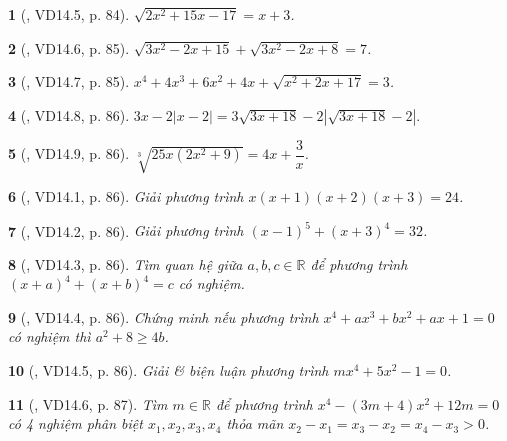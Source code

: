 \documentclass{article}
\newtheorem{baitoan}{}
\begin{document}
\begin{baitoan}[\cite{TLCT_THCS_Toan_9_dai_so}, VD14.5, p. 84]
	$\sqrt{2x^2 + 15x - 17} = x + 3$.
\end{baitoan}

\begin{baitoan}[\cite{TLCT_THCS_Toan_9_dai_so}, VD14.6, p. 85]
	$\sqrt{3x^2 - 2x + 15} + \sqrt{3x^2 - 2x + 8} = 7$.
\end{baitoan}

\begin{baitoan}[\cite{TLCT_THCS_Toan_9_dai_so}, VD14.7, p. 85]
	$x^4 + 4x^3 + 6x^2 + 4x + \sqrt{x^2 + 2x + 17} = 3$.
\end{baitoan}

\begin{baitoan}[\cite{TLCT_THCS_Toan_9_dai_so}, VD14.8, p. 86]
	$3x - 2|x - 2| = 3\sqrt{3x + 18} - 2|\sqrt{3x + 18} - 2|.$
 \end{baitoan}

\begin{baitoan}[\cite{TLCT_THCS_Toan_9_dai_so}, VD14.9, p. 86]
	$\sqrt[3]{25x(2x^2 + 9)} = 4x + \dfrac{3}{x}$.
\end{baitoan}

\begin{baitoan}[\cite{TLCT_THCS_Toan_9_dai_so}, VD14.1, p. 86]
	Giải phương trình $x(x + 1)(x + 2)(x + 3) = 24$.
\end{baitoan}

\begin{baitoan}[\cite{TLCT_THCS_Toan_9_dai_so}, VD14.2, p. 86]
	Giải phương trình $(x - 1)^5 + (x + 3)^4 = 32$.
\end{baitoan}

\begin{baitoan}[\cite{TLCT_THCS_Toan_9_dai_so}, VD14.3, p. 86]
	Tìm quan hệ giữa $a,b,c\in\mathbb{R}$ để phương trình $(x + a)^4 + (x + b)^4 = c$ có nghiệm.
\end{baitoan}

\begin{baitoan}[\cite{TLCT_THCS_Toan_9_dai_so}, VD14.4, p. 86]
	Chứng minh nếu phương trình $x^4 + ax^3 + bx^2 + ax + 1 = 0$ có nghiệm thì $a^2 + 8\ge4b$.
\end{baitoan}

\begin{baitoan}[\cite{TLCT_THCS_Toan_9_dai_so}, VD14.5, p. 86]
	Giải \& biện luận phương trình $mx^4 + 5x^2 - 1 = 0$.
\end{baitoan}

\begin{baitoan}[\cite{TLCT_THCS_Toan_9_dai_so}, VD14.6, p. 87]
	Tìm $m\in\mathbb{R}$ để phương trình $x^4 - (3m + 4)x^2 + 12m = 0$ có 4 nghiệm phân biệt $x_1,x_2,x_3,x_4$ thỏa mãn $x_2 - x_1 = x_3 - x_2 = x_4 - x_3 > 0$.
\end{baitoan}
\end{document}
